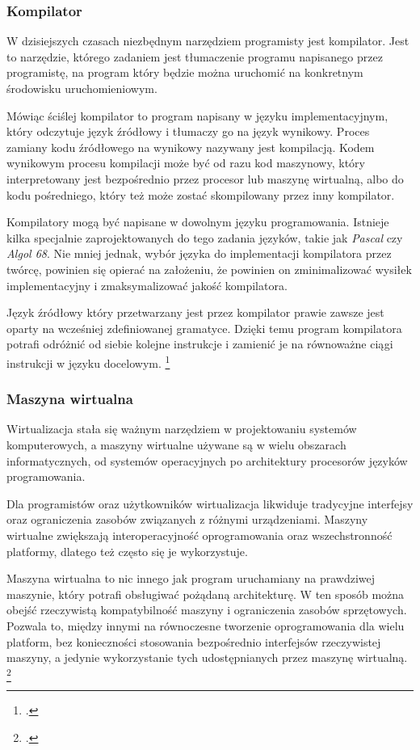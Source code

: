 \documentclass[a4paper]{article}
\begin{document}
\subsubsection{Kompilator}
W dzisiejszych czasach niezbędnym narzędziem programisty jest kompilator. Jest to narzędzie, którego zadaniem jest tłumaczenie programu napisanego przez programistę, na program który będzie można uruchomić na konkretnym środowisku uruchomieniowym.
\par Mówiąc ściślej kompilator to program napisany w języku implementacyjnym, który odczytuje język źródłowy i tłumaczy go na język wynikowy. Proces zamiany kodu źródłowego na wynikowy nazywany jest kompilacją. Kodem wynikowym procesu kompilacji może być od razu kod maszynowy, który interpretowany jest bezpośrednio przez procesor lub maszynę wirtualną, albo do kodu pośredniego, który też może zostać skompilowany przez inny kompilator.
\par Kompilatory mogą być napisane w dowolnym języku programowania. Istnieje kilka specjalnie zaprojektowanych do tego zadania języków, takie jak \textit{Pascal} czy \textit{Algol 68}. Nie mniej jednak, wybór języka do implementacji kompilatora przez twórcę, powinien się opierać na założeniu, że powinien on zminimalizować wysiłek implementacyjny i zmaksymalizować jakość kompilatora.
\par Język źródłowy który przetwarzany jest przez kompilator prawie zawsze jest oparty na wcześniej zdefiniowanej gramatyce. Dzięki temu program kompilatora potrafi odróżnić od siebie kolejne instrukcje i zamienić je na równoważne ciągi instrukcji w języku docelowym.
\footcite[1-4]{Mckeeman1974}

\subsubsection{Maszyna wirtualna}

\par Wirtualizacja stała się ważnym narzędziem w projektowaniu systemów komputerowych, a maszyny wirtualne używane są w wielu obszarach informatycznych, od systemów operacyjnych po architektury procesorów języków programowania.
\par Dla programistów oraz użytkowników wirtualizacja likwiduje tradycyjne interfejsy oraz ograniczenia zasobów związanych z różnymi urządzeniami. Maszyny wirtualne zwiększają interoperacyjność oprogramowania oraz wszechstronność platformy, dlatego też często się je wykorzystuje.
\par Maszyna wirtualna to nic innego jak program uruchamiany na prawdziwej maszynie, który potrafi obsługiwać pożądaną architekturę. W ten sposób można obejść rzeczywistą kompatybilność maszyny i ograniczenia zasobów sprzętowych. Pozwala to, między innymi na równoczesne tworzenie oprogramowania dla wielu platform, bez konieczności stosowania bezpośrednio interfejsów rzeczywistej maszyny, a jedynie wykorzystanie tych udostępnianych przez maszynę wirtualną. \footcite{Smith2005}
\end{document}
